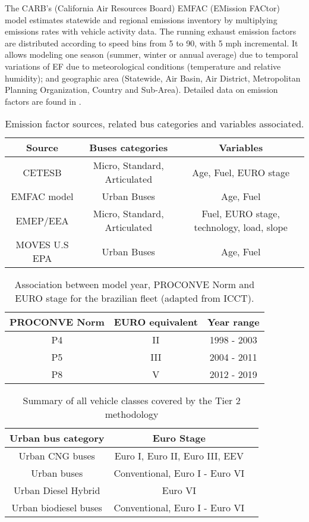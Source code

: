 \documentclass[gc, manuscript]{copernicus}
\begin{document}
The CARB's (California Air Resources Board) EMFAC (EMission FACtor)
model estimates statewide and regional emissions inventory by
multiplying emissions rates with vehicle activity data. The running
exhaust emission factors are distributed according to speed bins from 5
to 90, with 5 mph incremental. It allows modeling one season (summer,
winter or annual average) due to temporal variations of EF due to
meteorological conditions (temperature and relative humidity); and
geographic area (Statewide, Air Basin, Air District, Metropolitan
Planning Organization, Country and Sub-Area). Detailed data on emission
factors are found in \citet{noauthor_emfac_nodate}.

\begin{table*}[t]
\caption{Emission factor sources, related bus categories and variables associated.}
\begin{tabular}{ccc}
\hline
Source & Buses categories & Variables \\ \hline
CETESB & Micro, Standard, Articulated & Age, Fuel, EURO stage \\
EMFAC model & Urban Buses & Age, Fuel \\
EMEP/EEA & Micro, Standard, Articulated & Fuel, EURO stage, technology, load, slope \\
MOVES U.S EPA & Urban Buses & Age, Fuel \\
\hline
\end{tabular}
\end{table*}

\begin{table*}[t]
\caption{Association between model year, PROCONVE Norm and EURO stage for the brazilian fleet (adapted from ICCT).}
\begin{tabular}{ccc}
\hline
PROCONVE Norm & EURO equivalent & Year range \\ \hline
P4  & II  & 1998 - 2003 \\
P5  & III  & 2004 - 2011 \\
P8  & V & 2012 - 2019\\
\hline
\end{tabular}
\end{table*}

\begin{table*}[t]
\caption{Summary of all vehicle classes covered by the Tier 2 methodology}
\begin{tabular}{ccc}
\hline
Urban bus category  & Euro Stage  \\ \hline
Urban CNG buses & Euro I, Euro II, Euro III, EEV   \\
Urban buses   &  Conventional, Euro I - Euro VI\\
Urban Diesel Hybrid  & Euro VI  \\
Urban biodiesel buses   & Conventional, Euro I - Euro VI\\
\hline
\end{tabular}
\end{table*}
\end{document}
